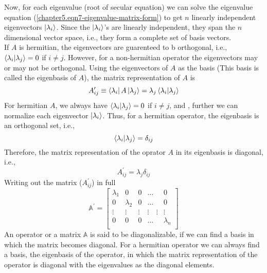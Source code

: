 	Now, for each eigenvalue (root of secular equation) we can solve the eigenvalue equation (\ref{chapter5.eqn7-eigenvalue-matrix-form}) to get $n$ linearly independent eigenvectors $\ket{\lambda_i}$. Since the $\ket{\lambda_i}$'s are linearly independent, they span the $n$ dimensional vector space, i.e., they form a complete set of basis vectors.\\
	If $A$ is hermitian, the eigenvectors are guarenteed to b orthogonal, i.e., $\braket{\lambda_i}{\lambda_j} = 0$ if $i\neq j$. However, for a non-hermitian operator the eigenvectors may or may not be orthogonal.
	Using the eigenvectors of $A$ as the basis (This basis is called the eigenbasis of $A$), the matrix representation of $A$ is
	\begin{equation}
		A_{ij}^\prime \equiv \bra{\lambda_i} A \ket{\lambda_j} = \lambda_j \braket{\lambda_i}{\lambda_j}
		\label{chapter5.eqn8-matrix-reps}
	\end{equation}
	For hermitian $A$, we always have $\braket{\lambda_i}{\lambda_j} = 0$ if $i \neq j$, and , further we can normalize each eigenvector $\ket{\lambda_i}$. Thus, for a hermitian operator, the eigenbasis is an orthogonal set, i.e., 
	\begin{equation}
		\braket{\lambda_i}{\lambda_j} = \delta_{ij}
		\label{chapter5.eqn9-eigenbasis}
	\end{equation}
	Therefore, the matrix representation of the oprator $A$ in its eigenbasis is diagonal, i.e.,
	\begin{equation}
		A_{ij}^\prime = \lambda_j\delta_{ij}
		\label{chapter5.eqn9-matrix-reps-diagonal}
	\end{equation}
	Writing out the matrix ($A_{ij}^\prime$) in full
	\begin{equation}
		\mathbb{A}^\prime = \left[
		\begin{matrix}
			\lambda_1 &	0	& 0	& \ldots	& 0 \\			
			0 &	\lambda_2	& 0	& \ldots	& 0 \\
			\vdots &	\vdots	& \vdots	& \vdots \quad \vdots	& \vdots \\	
			0 & 0	& 	 0 & \ldots	& \lambda_n  \\
		\end{matrix}
		\right]
	\end{equation}
	An operator or a matrix $\mathbb{A}$ is said to be diagonalizable, if we can find a basis in which the matrix becomes diagonal. For a hermitian operator we can always find a basis, the eigenbasis of the operator, in which the matrix representation of the operator is diagonal with the eigenvalues as the diagonal elements.\\
	
